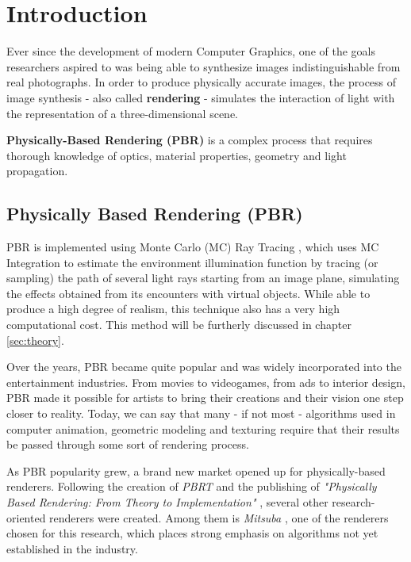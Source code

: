 \chapter{Introduction}
\label{sec:intro}

Ever since the development of modern Computer Graphics, one of the goals 
researchers aspired to was being able to synthesize images indistinguishable 
from real photographs. In order to produce physically accurate images, the 
process of image synthesis - also called \textbf{rendering} - simulates the 
interaction of light with the representation of a three-dimensional scene. 

\textbf{Physically-Based Rendering (PBR)} is a complex process that requires 
thorough knowledge of optics, material properties, geometry and light 
propagation.

\section{Physically Based Rendering (PBR)}
PBR is implemented using Monte Carlo (MC) Ray Tracing \cite{mcraytracing}, which uses MC 
Integration \cite{montecarlo} to estimate the environment illumination function 
by tracing (or sampling) the path of several light rays starting from an image 
plane, simulating the effects obtained from its encounters with virtual objects. 
While able to produce a high degree of realism, this technique also has a very 
high computational cost. This method will be furtherly discussed in chapter \ref{sec:theory}.

Over the years, PBR became quite popular and was widely incorporated into the 
entertainment industries. From movies to videogames, from ads to interior 
design, PBR made it possible for artists to bring their creations and their 
vision one step closer to reality. Today, we can say that many - if not most - 
algorithms used in computer animation, geometric modeling and texturing require 
that their results be passed through some sort of rendering process.

As PBR popularity grew, a brand new market opened up for physically-based 
renderers. Following the creation of \textit{PBRT} and the publishing of 
\textit{"Physically Based Rendering: From Theory to Implementation"} 
\cite{pbrt}, several other research-oriented renderers were created. Among them 
is \textit{Mitsuba} \cite{mitsuba}, one of the renderers chosen for this research, which places 
strong emphasis on algorithms not yet established in the industry.

